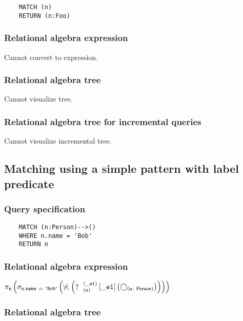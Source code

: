 	\begin{lstlisting}
	MATCH (n)
	RETURN (n:Foo)
	\end{lstlisting}


	\subsubsection*{Relational algebra expression}

	Cannot convert to expression.

	\subsubsection*{Relational algebra tree}

	Cannot visualize tree.

	\subsubsection*{Relational algebra tree for incremental queries}

	Cannot visualize incremental tree.
	\subsection{Matching using a simple pattern with label predicate}

	\subsubsection*{Query specification}

	\begin{lstlisting}
	MATCH (n:Person)-->()
	WHERE n.name = 'Bob'
	RETURN n
	\end{lstlisting}


	\subsubsection*{Relational algebra expression}

	$\projection{\var{n}} \left(\selection{\mathtt{n.name~=~'Bob'}} \left(\alldifferent{} \left(\expandout{n}{\_e1}{}{\_e1}{} \left(\getvertices{n}{Person}\right)\right)\right)\right)$

	\subsubsection*{Relational algebra tree}


